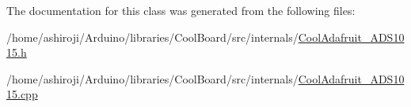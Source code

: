 The documentation for this class was generated from the following files\+:\begin{DoxyCompactItemize}
\item 
/home/ashiroji/\+Arduino/libraries/\+Cool\+Board/src/internals/\hyperlink{_cool_adafruit___a_d_s1015_8h}{Cool\+Adafruit\+\_\+\+A\+D\+S1015.\+h}\item 
/home/ashiroji/\+Arduino/libraries/\+Cool\+Board/src/internals/\hyperlink{_cool_adafruit___a_d_s1015_8cpp}{Cool\+Adafruit\+\_\+\+A\+D\+S1015.\+cpp}\end{DoxyCompactItemize}
